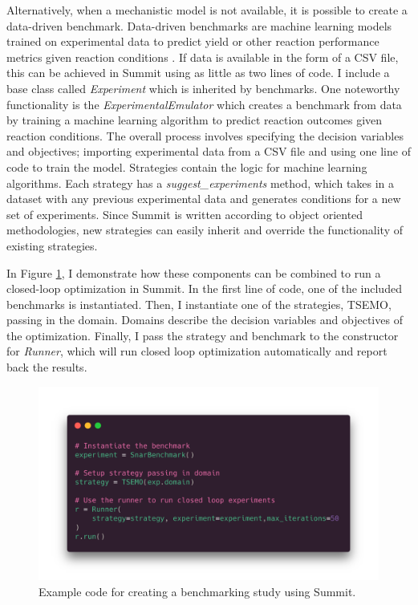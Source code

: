 Alternatively, when a mechanistic model is not available, it is possible to create a data-driven benchmark. Data-driven benchmarks are machine learning models trained on experimental data to predict yield or other reaction performance metrics given reaction conditions \cite{Hase2020a}.  If data is available in the form of a CSV file, this can be achieved in Summit using as little as two lines of code. I include a base class called \textit{Experiment} which is inherited by benchmarks. One noteworthy functionality is the \textit{ExperimentalEmulator} which creates a benchmark from data by training a machine learning algorithm to predict reaction outcomes given reaction conditions. The overall process involves specifying the decision variables and objectives; importing experimental data from a CSV file and using one line of code to train the model. Strategies contain the logic for machine learning algorithms. Each strategy has a \textit{suggest\_experiments} method, which takes in a dataset with any previous experimental data and generates conditions for a new set of experiments.  Since Summit is written according to object oriented methodologies, new strategies can easily inherit and override the functionality of existing strategies.

In Figure \ref{fig:code_example}, I demonstrate how these components can be combined to run a closed-loop optimization in Summit. In the first line of code, one of the included benchmarks is instantiated. Then, I instantiate one of the strategies, TSEMO, passing in the domain. Domains describe the decision variables and objectives of the optimization. Finally, I pass the strategy and benchmark to the constructor for \textit{Runner}, which will run closed loop optimization automatically and report back the results. 

\begin{figure}
    \centering
    \includegraphics[width=\textwidth]{gfx/Chapter03/paraiso.png}
    \caption{Example code for creating a benchmarking study using Summit.}
    \label{fig:code_example}
\end{figure}

